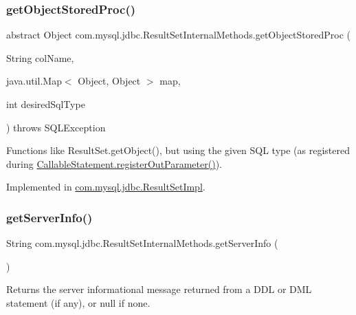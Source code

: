 \subsubsection{\texorpdfstring{get\+Object\+Stored\+Proc()}{getObjectStoredProc()}\hspace{0.1cm}{\footnotesize\ttfamily [4/4]}}
{\footnotesize\ttfamily abstract Object com.\+mysql.\+jdbc.\+Result\+Set\+Internal\+Methods.\+get\+Object\+Stored\+Proc (\begin{DoxyParamCaption}\item[{String}]{col\+Name,  }\item[{java.\+util.\+Map$<$ Object, Object $>$}]{map,  }\item[{int}]{desired\+Sql\+Type }\end{DoxyParamCaption}) throws S\+Q\+L\+Exception\hspace{0.3cm}{\ttfamily [abstract]}}

Functions like Result\+Set.\+get\+Object(), but using the given S\+QL type (as registered during \mbox{\hyperlink{classcom_1_1mysql_1_1jdbc_1_1_callable_statement_a5158af0506cf90040062b2049550f59b}{Callable\+Statement.\+register\+Out\+Parameter()}}). 

Implemented in \mbox{\hyperlink{classcom_1_1mysql_1_1jdbc_1_1_result_set_impl_a9d1a5e010a5b824c7c8019dea3ce23e9}{com.\+mysql.\+jdbc.\+Result\+Set\+Impl}}.

\mbox{\label{interfacecom_1_1mysql_1_1jdbc_1_1_result_set_internal_methods_add46fbb3bd5ecdfe2fa1fa77b3816425}} 
\subsubsection{\texorpdfstring{get\+Server\+Info()}{getServerInfo()}}
{\footnotesize\ttfamily String com.\+mysql.\+jdbc.\+Result\+Set\+Internal\+Methods.\+get\+Server\+Info (\begin{DoxyParamCaption}{ }\end{DoxyParamCaption})}

Returns the server informational message returned from a D\+DL or D\+ML statement (if any), or null if none. 

